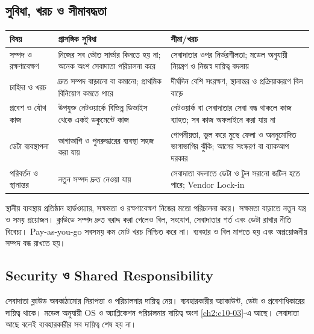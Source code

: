 \subsection{সুবিধা, খরচ ও সীমাবদ্ধতা}
\label{ch2:c10-12}
\begin{tabularx}{\linewidth}{|p{.28\linewidth}|X|X|}\hline
\textbf{বিষয়} & \textbf{প্রাসঙ্গিক সুবিধা} & \textbf{সীমা/খরচ}\\\hline
সম্পদ ও রক্ষণাবেক্ষণ & নিজের সব ভৌত সার্ভার কিনতে হয় না; অনেক অংশ সেবাদাতা পরিচালনা করে & সেবাদাতার ওপর নির্ভরশীলতা; মডেল অনুযায়ী নিয়ন্ত্রণ ও নিজস্ব দায়িত্ব বদলায়\\\hline
চাহিদা ও খরচ & দ্রুত সম্পদ বাড়ানো বা কমানো; প্রাথমিক বিনিয়োগ কমতে পারে & দীর্ঘদিন বেশি সংরক্ষণ, স্থানান্তর ও প্রক্রিয়াকরণে বিল বাড়ে\\\hline
প্রবেশ ও যৌথ কাজ & উপযুক্ত নেটওয়ার্কে বিভিন্ন ডিভাইস থেকে একই ডকুমেন্টে কাজ & নেটওয়ার্ক বা সেবাদাতার সেবা বন্ধ থাকলে কাজ ব্যাহত; সব কাজ অফলাইনে করা যায় না\\\hline
ডেটা ব্যবস্থাপনা & ভাগাভাগি ও পুনরুদ্ধারের ব্যবস্থা সহজ করা যায় & গোপনীয়তা, ভুল করে মুছে ফেলা ও অননুমোদিত ভাগাভাগির ঝুঁকি; আগের সংস্করণ বা ব্যাকআপ দরকার\\\hline
পরিবর্তন ও স্থানান্তর & নতুন সম্পদ দ্রুত নেওয়া যায় & সেবাদাতা বদলাতে ডেটা ও টুল সরানো জটিল হতে পারে; Vendor Lock-in\\\hline
\end{tabularx}
স্থানীয় ব্যবস্থায় প্রতিষ্ঠান হার্ডওয়্যার, সক্ষমতা ও রক্ষণাবেক্ষণ নিজের মতো পরিচালনা করে। সক্ষমতা বাড়াতে নতুন যন্ত্র ও সময় প্রয়োজন। ক্লাউডে সম্পদ দ্রুত বরাদ্দ করা গেলেও বিল, সংযোগ, সেবাদাতার শর্ত এবং ডেটা রাখার নীতি বিবেচ্য। Pay-as-you-go সবসময় কম মোট খরচ নিশ্চিত করে না। ব্যবহার ও বিল মাপতে হয় এবং অপ্রয়োজনীয় সম্পদ বন্ধ রাখতে হয়।

\subsection{Security ও Shared Responsibility}
\label{ch2:c10-13}
সেবাদাতা ক্লাউড অবকাঠামোর নিরাপত্তা ও পরিচালনার দায়িত্ব নেয়। ব্যবহারকারীর অ্যাকাউন্ট, ডেটা ও প্রবেশাধিকারের দায়িত্ব থাকে। মডেল অনুযায়ী OS ও অ্যাপ্লিকেশন পরিচালনার দায়িত্ব অংশ \ref{ch2:c10-03}-এ আছে। সেবাদাতা আছে বলেই ব্যবহারকারীর সব দায়িত্ব শেষ হয় না।


